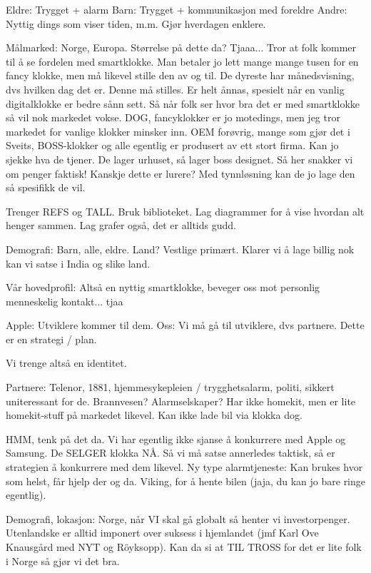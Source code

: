 Eldre: Trygget + alarm
Barn: Trygget + kommunikasjon med foreldre
Andre: Nyttig dings som viser tiden, m.m. Gjør hverdagen enklere.

Målmarked: Norge, Europa. Størrelse på dette da? Tjaaa... Tror at folk kommer
til å se fordelen med smartklokke. Man betaler jo lett mange mange tusen for en
fancy klokke, men må likevel stille den av og til. De dyreste har
månedsvisning, dvs hvilken dag det er. Denne må stilles. Er helt ånnas,
spesielt når en vanlig digitalklokke er bedre sånn sett. Så når folk ser hvor
bra det er med smartklokke så vil nok markedet vokse. DOG, fancyklokker er jo
motedings, men jeg tror markedet for vanlige klokker minsker inn. OEM forøvrig,
mange som gjør det i Sveits, BOSS-klokker og alle egentlig er produsert av ett
stort firma. Kan jo sjekke hva de tjener. De lager urhuset, så lager boss
designet. Så her snakker vi om penger faktisk! Kanskje dette er lurere? Med
tynnløsning kan de jo lage den så spesifikk de vil.

Trenger REFS og TALL. Bruk biblioteket. Lag diagrammer for å vise hvordan alt
henger sammen. Lag grafer også, det er alltids gudd.

Demografi: Barn, alle, eldre. Land? Vestlige primært. Klarer vi å lage billig
nok kan vi satse i India og slike land.

Vår hovedprofil: Altså en nyttig smartklokke, beveger oss mot personlig
menneskelig kontakt... tjaa 

Apple: Utviklere kommer til dem. Oss: Vi må gå til utviklere, dvs partnere.
Dette er en strategi / plan.

Vi trenge altså en identitet.

Partnere: Telenor, 1881, hjemmesykepleien / trygghetsalarm, politi, sikkert
uniteressant for de. Brannvesen? Alarmselskaper? Har ikke homekit, men er lite
homekit-stuff på markedet likevel. Kan ikke lade bil via klokka dog.

HMM, tenk på det da. Vi har egentlig ikke sjanse å konkurrere med Apple og
Samsung. De SELGER klokka NÅ. Så vi må satse annerledes taktisk, så er
strategien å konkurrere med dem likevel. Ny type alarmtjeneste: Kan brukes hvor
som helst, får hjelp der og da. Viking, for å hente bilen (jaja, du kan jo bare
ringe egentlig).

Demografi, lokasjon: Norge, når VI skal gå globalt så henter vi investorpenger.
Utenlandske er alltid imponert over suksess i hjemlandet (jmf Karl Ove
Knausgård med NYT og Röyksopp). Kan da si at TIL TROSS for det er lite folk i
Norge så gjør vi det bra.

